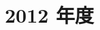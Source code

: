 \documentclass[../../hsm_tok_a.tex]{subfiles}
\begin{document}
    \section{2012 年度}

    

    \clearpage

    
\end{document}
